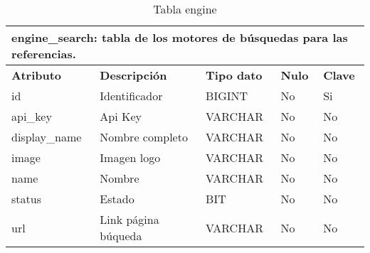 \begin{table}[!hbt]
	\begin{center}
		\begin{tabular}{|p{3cm}|p{4cm}|p{4cm}|p{2cm}|p{2cm}|}
			\hline
			\multicolumn{5}{|l|}{\textbf{engine\_search:} tabla de los motores de búsquedas para las referencias.} \\
			\hline
			\hline
			\textbf{Atributo} & \textbf{Descripción} & \textbf{Tipo dato} & \textbf{Nulo} & \textbf{Clave}\\
			\hline
			id & Identificador  & BIGINT & No & Si\\
			\hline
			api\_key & Api Key & VARCHAR & No & No\\
			\hline
			display\_name & Nombre completo & VARCHAR & No & No\\
			\hline
			image & Imagen logo & VARCHAR & No & No\\
			\hline
			name & Nombre & VARCHAR & No & No\\
			\hline
			status & Estado & BIT & No & No\\
			\hline
			url & Link página búqueda & VARCHAR & No & No\\
			\hline
		\end{tabular}
		\caption{Tabla engine}
		\label{table:db-engine}
	\end{center}
\end{table}

